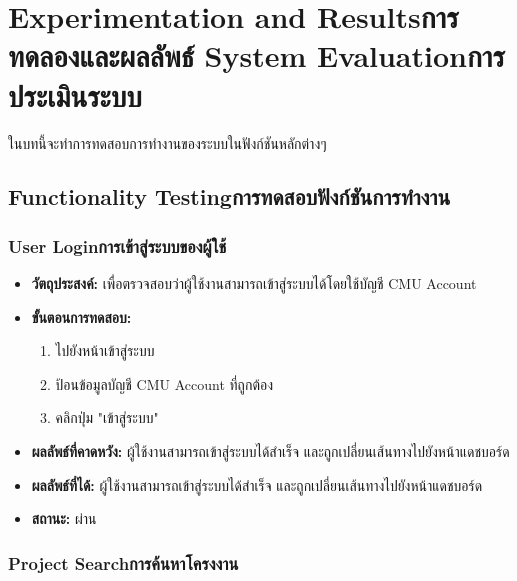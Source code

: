 \chapter{\ifproject%
\ifenglish Experimentation and Results\else การทดลองและผลลัพธ์\fi
\else%
\ifenglish System Evaluation\else การประเมินระบบ\fi
\fi
}

ในบทนี้จะทำการทดสอบการทำงานของระบบในฟังก์ชันหลักต่างๆ

\section{\ifenglish Functionality Testing\else การทดสอบฟังก์ชันการทำงาน\fi}

\subsection{\ifenglish User Login\else การเข้าสู่ระบบของผู้ใช้\fi}
\begin{itemize}
  \item \textbf{วัตถุประสงค์:} เพื่อตรวจสอบว่าผู้ใช้งานสามารถเข้าสู่ระบบได้โดยใช้บัญชี CMU Account
  \item \textbf{ขั้นตอนการทดสอบ:}
  \begin{enumerate}
    \item ไปยังหน้าเข้าสู่ระบบ
    \item ป้อนข้อมูลบัญชี CMU Account ที่ถูกต้อง
    \item คลิกปุ่ม "เข้าสู่ระบบ"
  \end{enumerate}
  \item \textbf{ผลลัพธ์ที่คาดหวัง:} ผู้ใช้งานสามารถเข้าสู่ระบบได้สำเร็จ และถูกเปลี่ยนเส้นทางไปยังหน้าแดชบอร์ด
  \item \textbf{ผลลัพธ์ที่ได้:} ผู้ใช้งานสามารถเข้าสู่ระบบได้สำเร็จ และถูกเปลี่ยนเส้นทางไปยังหน้าแดชบอร์ด
  \item \textbf{สถานะ:} ผ่าน
\end{itemize}

\subsection{\ifenglish Project Search\else การค้นหาโครงงาน\fi}

